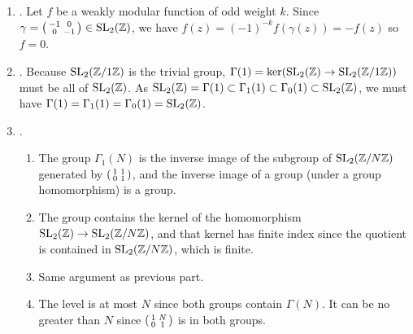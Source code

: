\begin{enumerate}
\begin{enumerate}
\item Let $f$ and $g$ be modular functions. Then, as above, $fg$ is a
  weakly modular function.  Let $\sum_{n=m}^\infty a_nq^n$ and
  $\sum_{n=m'}^\infty b_nq^n$ be their $q$-expansions around any
  $\alpha \in \P^1(\Q)$; then their formal product is the
  $q$-expansion of $fg$. But the formal product of two Laurent series
  about the same point is itself a Laurent series with convergence in
  the intersection of the convergent domains of the original series,
  so $fg$ has a meromorphic $q$-expansion at each $\alpha \in
  \P^1(\Q)$ and hence at each cusp.

\item We are in exactly the same case as in part (c), but because $f$
  and $g$ are modular functions, $m, m'\ge 0$ and hence the function
  is holomorphic at each of its cusps.

\end{enumerate}

\item {}.
Let $f$ be a weakly modular function of odd weight
$k$. Since
$\gamma 
   = \left( \begin{smallmatrix}-1&0\\0&-1\end{smallmatrix}\right) \in \operatorname{SL}_2(\mathbb{Z})$, we have $f(z) =
(-1)^{-k}f(\gamma(z)) = -f(z)$ so $f = 0$.

\item  {}.
  Because $\operatorname{SL}_2(\mathbb{Z}/1\mathbb{Z})$ is the trivial group, $\Gamma(1) =
  \ker(\operatorname{SL}_2(\mathbb{Z}) \rightarrow \operatorname{SL}_2(\mathbb{Z}/1\mathbb{Z}))$ must be all of
  $\operatorname{SL}_2(\mathbb{Z})$.  As $\operatorname{SL}_2(\mathbb{Z}) = \Gamma(1) \subset \Gamma_1(1)
  \subset \Gamma_0(1) \subset \operatorname{SL}_2(\mathbb{Z})$, we must have $\Gamma(1) =
  \Gamma_1(1) = \Gamma_0(1) = \operatorname{SL}_2(\mathbb{Z})$.

\item {}.
\begin{enumerate}
\item The group $\Gamma_1(N)$ is the inverse image of
the subgroup of $\operatorname{SL}_2(\mathbb{Z}/N\mathbb{Z})$ generated by $\left( \begin{smallmatrix}1&1\\0&1\end{smallmatrix}\right)$, and
the inverse image of a group (under a group homomorphism)
is a group.
\item The group contains the kernel of the homomorphism
$\operatorname{SL}_2(\mathbb{Z}) \to \operatorname{SL}_2(\mathbb{Z}/N\mathbb{Z})$, and 
that kernel has finite index since the quotient is
contained in $\operatorname{SL}_2(\mathbb{Z}/N\mathbb{Z})$, which is finite. 
\item Same argument as previous part. 
\item The level is at most $N$ since both groups contain $\Gamma(N)$.
  It can be no greater than $N$ since $\left( \begin{smallmatrix}1&N\\0&1\end{smallmatrix}\right)$ is in both
  groups.
\end{enumerate}


\end{enumerate}

